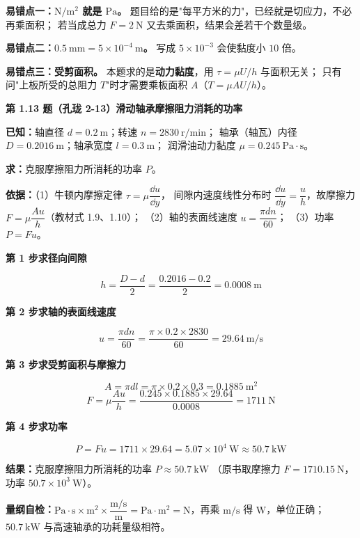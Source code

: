 \begin{yicuo}
\textbf{易错点一：$\mathrm{N/m^2}$ 就是 $\mathrm{Pa}$。}
题目给的是"每平方米的力"，已经就是切应力，不必再乘面积；
若当成总力 $F=2\ \mathrm{N}$ 又去乘面积，结果会差若干个数量级。

\textbf{易错点二：$0.5\ \mathrm{mm}=5\times10^{-4}\ \mathrm{m}$。}
写成 $5\times10^{-3}$ 会使黏度小 $10$ 倍。

\textbf{易错点三：受剪面积。}
本题求的是\textbf{动力黏度}，用 $\tau=\mu U/h$ 与面积无关；
只有问"上板所受的总阻力 $T$"时才需要乘板面积 $A$（$T=\mu AU/h$）。
\end{yicuo}

\noindent\textbf{第 1.13 题（孔珑 2-13）\quad 滑动轴承摩擦阻力消耗的功率}

\begin{jie}
\textbf{已知：}轴直径 $d=0.2\ \mathrm{m}$；转速 $n=2830\ \mathrm{r/min}$；
轴承（轴瓦）内径 $D=0.2016\ \mathrm{m}$；轴承宽度 $l=0.3\ \mathrm{m}$；
润滑油动力黏度 $\mu=0.245\ \mathrm{Pa\cdot s}$。

\textbf{求：}克服摩擦阻力所消耗的功率 $P$。

\textbf{依据：}（1）牛顿内摩擦定律 $\tau=\mu\dfrac{\dd u}{\dd y}$，
间隙内速度线性分布时 $\dfrac{\dd u}{\dd y}=\dfrac{u}{h}$，故摩擦力
$F=\mu\dfrac{A u}{h}$（教材式 1.9、1.10）；
（2）轴的表面线速度 $u=\dfrac{\pi d n}{60}$；
（3）功率 $P=Fu$。

\textbf{第 1 步\quad 求径向间隙}

\[ h=\frac{D-d}{2}=\frac{0.2016-0.2}{2}=0.0008\ \mathrm{m} \]

\textbf{第 2 步\quad 求轴的表面线速度}

\[ u=\frac{\pi d n}{60}=\frac{\pi\times0.2\times2830}{60}=29.64\ \mathrm{m/s} \]

\textbf{第 3 步\quad 求受剪面积与摩擦力}

\[ A=\pi d l=\pi\times0.2\times0.3=0.1885\ \mathrm{m^2} \]
\[ F=\mu\frac{A u}{h}=\frac{0.245\times0.1885\times29.64}{0.0008}=1711\ \mathrm{N} \]

\textbf{第 4 步\quad 求功率}

\[ P=Fu=1711\times29.64=5.07\times10^{4}\ \mathrm{W}\approx50.7\ \mathrm{kW} \]

\textbf{结果：}克服摩擦阻力所消耗的功率 $P\approx50.7\ \mathrm{kW}$
（原书取摩擦力 $F=1710.15\ \mathrm{N}$，功率 $50.7\times10^{3}\ \mathrm{W}$）。

\textbf{量纲自检：}$\mathrm{Pa\cdot s}\times\mathrm{m^2}\times\dfrac{\mathrm{m/s}}{\mathrm{m}}
=\mathrm{Pa\cdot m^2}=\mathrm{N}$，再乘 $\mathrm{m/s}$ 得 $\mathrm{W}$，单位正确；
$50.7\ \mathrm{kW}$ 与高速轴承的功耗量级相符。
\end{jie}

